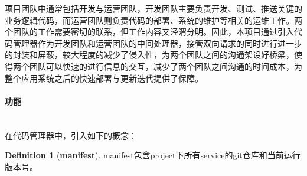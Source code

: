 \documentclass[a4paper, 12pt]{article}
\theoremstyle{definition}
\newtheorem{definition}{Definition}[section]
\begin{document}
项目团队中通常包括开发与运营团队，开发团队主要负责开发、测试、推送关键的业务逻辑代码，而运营团队则负责代码的部署、系统的维护等相关的运维工作。两个团队的工作需要密切的联系，但工作内容又泾渭分明。因此，本项目通过引入代码管理器作为开发团队和运营团队的中间处理器，接管双向请求的同时进行进一步的封装和屏蔽，较大程度的减少了侵入性，为两个团队之间的沟通架设好桥梁，使得两个团队可以快速的进行信息的交互，减少了两个团队之间沟通的时间成本，为整个应用系统之后的快速部署与更新迭代提供了保障。

\paragraph{功能}\mbox{}\\

在代码管理器中，引入如下的概念：
\theoremstyle{definition}
\begin{definition}[\textbf{manifest}]
\label{definition:manifest}
manifest包含project下所有service的git仓库和当前运行版本号。
\end{definition}
\end{document}
